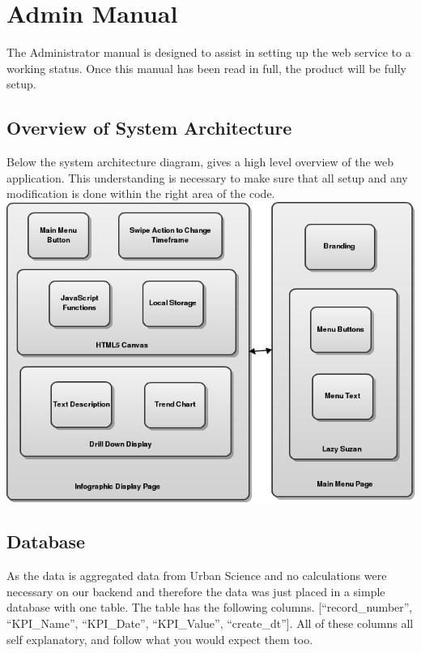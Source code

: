 \documentclass[11pt,a4paper,oneside]{article}
\begin{document}
\tableofcontents
\newpage


\section{Admin Manual}
The Administrator manual is designed to assist in setting up the web service to a working status. Once this manual has been read in full, the product will be fully setup.\\

\subsection{Overview of System Architecture}
Below the system architecture diagram, gives a high level overview of the web application. This understanding is necessary to make sure that all setup and any modification is done within the right area of the code.\\

\includegraphics[width=.9\textwidth]{images/Capstone_-_System_Architecture_Diagram.png}\\   

\subsection{Database}
As the data is aggregated data from Urban Science and no calculations were necessary on our backend and therefore the data was just placed in a simple database with one table. The table has the following columns. {[}“record\_number”, “KPI\_Name”, “KPI\_Date”, “KPI\_Value”, “create\_dt”{]}. All of these columns all self explanatory, and follow what you would expect them too.\\
\end{document}
